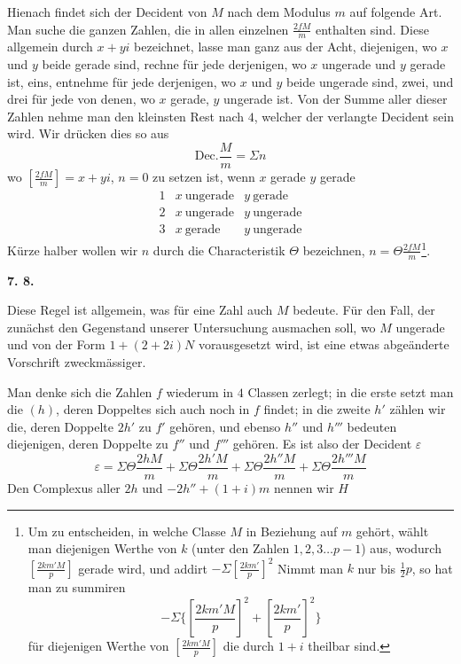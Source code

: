 Hienach findet sich der Decident von $M$ nach dem Modulus $m$ auf folgende Art. Man suche die ganzen Zahlen, die in allen einzelnen $\frac{2fM}{m}$ enthalten sind. Diese allgemein durch $x+yi$ bezeichnet, lasse man ganz aus der Acht, diejenigen, wo $x$ und $y$ beide gerade sind, rechne für jede derjenigen, wo $x$ ungerade und $y$ gerade ist, eins, entnehme für jede derjenigen, wo $x$ und $y$ beide ungerade sind, zwei, und drei für jede von denen, wo $x$ gerade, $y$ ungerade ist. Von der Summe aller dieser Zahlen nehme man den kleinsten Rest nach $4$, welcher der verlangte Decident sein wird. Wir drücken dies so aus
\[
\mathrm{Dec.}\frac{M}{m}=\Sigma n
\]
wo $[\frac{2fM}{m}]=x+yi$, $n=0$ zu setzen ist, wenn $x$ gerade $y$ gerade
\[
\begin{array}{cll}
1&x\ \text{ungerade}&y\ \text{gerade}\\
2&x\ \text{ungerade}&y\ \text{ungerade}\\
3&x\ \text{gerade}&y\ \text{ungerade}
\end{array}
\]
Kürze halber wollen wir $n$ durch die Characteristik $\Theta$ bezeichnen, $n=\Theta\frac{2fM}{m}$\begingroup\renewcommand{\thefootnote}{*)}\footnote{Um zu entscheiden, in welche Classe $M$ in Beziehung auf $m$ gehört, wählt man diejenigen Werthe von $k$ (unter den Zahlen $1,2,3\ldots p-1$) aus, wodurch $[\frac{2km'M}{p}]$ gerade wird, und addirt $-\Sigma[\frac{2km'}{p}]^2$ Nimmt man $k$ nur bis $\frac12p$, so hat man zu summiren
\[
-\Sigma\{[\frac{2km'M}{p}]^2+[\frac{2km'}{p}]^2\}
\]
für diejenigen Werthe von $[\frac{2km'M}{p}]$ die durch $1+i$ theilbar sind.}\endgroup.

%
\par\medskip{}\centerline{\textbf{7. 8.}}\nobreak\smallskip
Diese Regel ist allgemein, was für eine Zahl auch $M$ bedeute. Für den Fall, der zunächst den Gegenstand unserer Untersuchung ausmachen soll, wo $M$ ungerade und von der Form $1+(2+2i)N$ vorausgesetzt wird, ist eine etwas abgeänderte Vorschrift zweckmässiger.

Man denke sich die Zahlen $f$ wiederum in $4$ Classen zerlegt; in die erste setzt man die $(h)$, deren Doppeltes sich auch noch in $f$ findet; in die zweite $h'$ zählen wir die, deren Doppelte $2h'$ zu $f'$ gehören, und ebenso $h''$ und $h'''$ bedeuten diejenigen, deren Doppelte zu $f''$ und $f'''$ gehören. Es ist also der Decident $\varepsilon$
\[
\varepsilon=\Sigma\Theta\frac{2hM}{m}+\Sigma\Theta\frac{2h'M}{m}+\Sigma\Theta\frac{2h''M}{m}+\Sigma\Theta\frac{2h'''M}{m}
\]
Den Complexus aller $2h$ und $-2h''+(1+i)m$ nennen wir $H$

